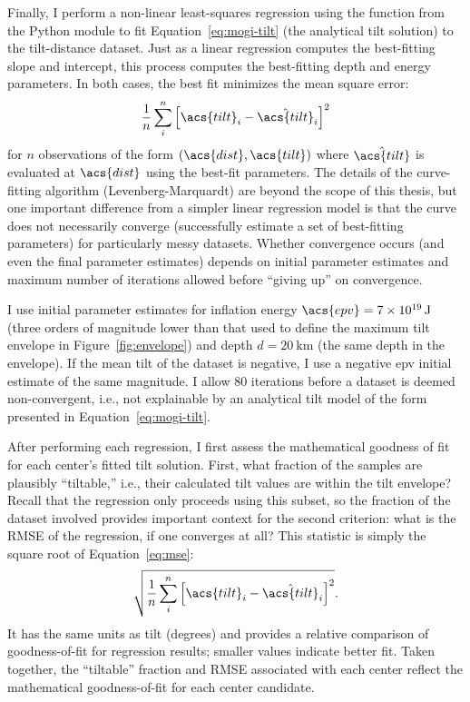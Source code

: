 Finally, I perform a non-linear least-squares regression using the  function from the  Python module \parencite{2020SciPy-NMeth} to fit Equation~\eqref{eq:mogi-tilt} (the analytical tilt solution) to the tilt-distance dataset. Just as a linear regression computes the best-fitting slope and intercept, this process computes the best-fitting depth and energy parameters. In both cases, the best fit minimizes the mean square error:
\begin{equation}
    \frac{1}{n}\sum_{i}^{n}{\left[\acs{tilt}_i-\hat{\acs{tilt}}_i\right]}^2\label{eq:mse}
\end{equation}
for $n$ observations of the form $(\acs{dist}, \acs{tilt})$ where $\hat{\acs{tilt}}$ is evaluated at $\acs{dist}$ using the best-fit parameters. The details of the curve-fitting algorithm (Levenberg-Marquardt) are beyond the scope of this thesis, but one important difference from a simpler linear regression model is that the curve does not necessarily converge (successfully estimate a set of best-fitting parameters) for particularly messy datasets. Whether convergence occurs (and even the final parameter estimates) depends on initial parameter estimates and maximum number of iterations allowed before ``giving up'' on convergence.

I use initial parameter estimates for inflation energy $\acs{epv} = \qty{7e19}{\J}$ (three orders of magnitude lower than that used to define the maximum tilt envelope in Figure~\ref{fig:envelope}) and depth $d = \qty{20}{\km}$ (the same depth in the envelope). If the mean tilt of the dataset is negative, I use a negative \acs{epv} initial estimate of the same magnitude. I allow 80 iterations before a dataset is deemed non-convergent, i.e., not explainable by an analytical tilt model of the form presented in Equation~\eqref{eq:mogi-tilt}.

After performing each regression, I first assess the mathematical goodness of fit for each center's fitted tilt solution. First, what fraction of the samples are plausibly ``tiltable,'' i.e., their calculated tilt values are within the tilt envelope? Recall that the regression only proceeds using this subset, so the fraction of the dataset involved provides important context for the second criterion: what is the \ac{RMSE} of the regression, if one converges at all? This statistic is simply the square root of Equation~\eqref{eq:mse}:
\begin{equation}
    \sqrt{\frac{1}{n}\sum_{i}^{n}{\left[\acs{tilt}_i-\hat{\acs{tilt}}_i\right]}^2}.\label{eq:rmse}
\end{equation}
It has the same units as \acs{tilt} (degrees) and provides a relative comparison of goodness-of-fit for regression results; smaller values indicate better fit. Taken together, the ``tiltable'' fraction and \ac{RMSE} associated with each center reflect the mathematical goodness-of-fit for each center candidate.

